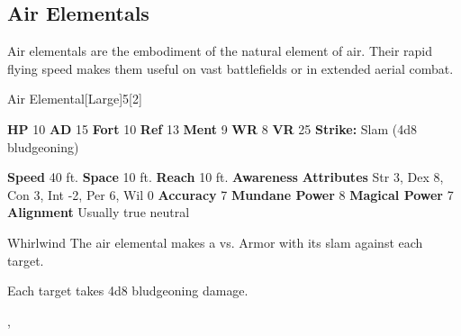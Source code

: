       
    \subsection{Air Elementals}
      
    Air elementals are the embodiment of the natural element of air.
    Their rapid flying speed makes them useful on vast battlefields or in extended aerial combat.
  

      

      
  \begin{monsubsection}{Air Elemental}[Large]{5}[2]
    \vspace{-1em}\vspace{-1em}
    \vspace{0em}

    
    

    \begin{spellcontent}
      \begin{spelltargetinginfo}
        \pari \textbf{HP} 10 \monsep
          \textbf{AD} 15 \monsep
          \textbf{Fort} 10 \monsep
          \textbf{Ref} 13 \monsep
          \textbf{Ment} 9
        \pari \textbf{WR} 8 \monsep
        \textbf{VR} 25
        \pari \textbf{Strike:}
            Slam  (4d8 bludgeoning)
      \end{spelltargetinginfo}
    \end{spellcontent}
    \begin{monsterfooter}
      \pari \textbf{Speed} 40 ft. \monsep
        \textbf{Space} 10 ft. \monsep
        \textbf{Reach} 10 ft.
      \pari \textbf{Awareness} 
      \pari \textbf{Attributes}
        Str 3, Dex 8,
        Con 3, Int -2,
        Per 6, Wil 0
      \pari \textbf{Accuracy} 7 \monsep
        \textbf{Mundane Power} 8 \monsep
      \textbf{Magical Power} 7
      \pari \textbf{Alignment} Usually true neutral
    \end{monsterfooter}
  \end{monsubsection}
  \begin{freeability}{Whirlwind}
       The air elemental makes a 
         vs. Armor
        with its slam against each target.
    
    \hit Each target takes 4d8 bludgeoning damage.
    \end{freeability}
  ,
